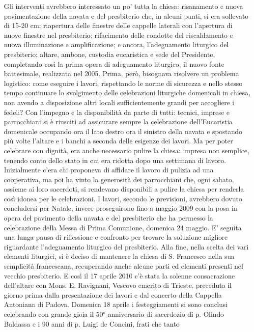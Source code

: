 Gli interventi avrebbero interessato un po' tutta la chiesa: risanamento e nuova pavimentazione della 
navata e del presbiterio che, in alcuni punti, si era sollevato di 15-20 cm; riapertura delle finestre 
delle cappelle laterali con l'apertura di nuove finestre nel presbiterio; rifacimento delle condotte del 
riscaldamento e nuova illuminazione e amplificazione; e ancora, l'adeguamento liturgico del 
presbiterio: altare, ambone, custodia eucaristica e sede del Presidente, completando così la prima 
opera di adeguamento liturgico, il nuovo fonte battesimale, realizzata nel 2005.
Prima, però, bisognava risolvere un problema logistico: come eseguire i lavori, rispettando le norme 
di sicurezza e nello stesso tempo continuare lo svolgimento delle celebrazioni liturgiche domenicali 
in chiesa, non avendo a disposizione altri locali sufficientemente grandi per accogliere i fedeli?
Con l'impegno e la disponibilità da parte di tutti: tecnici, imprese e parrocchiani si è riusciti ad 
assicurare sempre la celebrazione dell'Eucaristia domenicale occupando ora il lato destro ora il 
sinistro della navata e spostando più volte l'altare e i banchi a seconda delle esigenze dei lavori.
Ma per poter celebrare con dignità, era anche necessario pulire la chiesa: impresa non 
semplice, tenendo conto dello stato in cui era ridotta dopo una settimana di lavoro. 
Inizialmente c'era chi proponeva di affidare il lavoro di pulizia ad una cooperativa, ma poi ha vinto 
la generosità dei parrocchiani che, ogni sabato, assieme ai loro sacerdoti, si rendevano disponibili a 
pulire la chiesa per renderla così idonea per le celebrazioni.
I lavori, secondo le previsioni, avrebbero dovuto concludersi per Natale, invece 
proseguirono fino a maggio 2009 con la posa in opera del pavimento della navata e del presbiterio 
che ha permesso la celebrazione della Messa di Prima Comunione, domenica 24 maggio. 
E' seguita una lunga pausa di riflessione e confronto per trovare la soluzione migliore riguardante 
l'adeguamento liturgico del presbiterio. Alla fine, nella scelta dei vari elementi liturgici, si è deciso 
di mantenere la chiesa di S. Francesco nella sua semplicità francescana, recuperando anche alcune 
parti ed elementi presenti nel vecchio presbiterio.
E così il 17 aprile 2010 c'è stata la solenne consacrazione dell'altare con Mons. E. 
Ravignani, Vescovo emerito di Trieste, preceduta il giorno prima dalla presentazione dei lavori e 
dal concerto della Cappella Antoniana di Padova. 
Domenica 18 aprile i festeggiamenti si sono conclusi celebrando con grande gioia il 50° 
anniversario di sacerdozio di p. Olindo Baldassa e i 90 anni di p. Luigi de Concini, frati che tanto 
